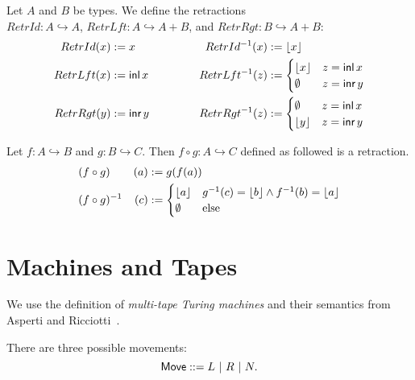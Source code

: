 \begin{definition}
  \label{def:retracts-basic}
  Let $A$ and $B$ be types.  We define the retractions\\
  $RetrId : A \hookrightarrow A$, $RetrLft : A \hookrightarrow A+B$, and $RetrRgt : B \hookrightarrow A+B$:
  \begin{alignat*}{2}
    RetrId(x)  &:= x      &\qquad\qquad RetrId ^{-1} (x) &:= \left\lfloor {x} \right\rfloor \\
    RetrLft(x) &:= \operatorname{\textsf{inl}} x &             RetrLft^{-1} (z) &:=
    \begin{cases}
      \left\lfloor {x} \right\rfloor & z = \operatorname{\textsf{inl}} x \\
      \emptyset   & z = \operatorname{\textsf{inr}} y
    \end{cases} \\
    RetrRgt(y) &:= \operatorname{\textsf{inr}} y & RetrRgt^{-1} (z) &:=
    \begin{cases}
      \emptyset   & z = \operatorname{\textsf{inl}} x \\
      \left\lfloor {y} \right\rfloor & z = \operatorname{\textsf{inr}} y
    \end{cases}
  \end{alignat*}
\end{definition}

\begin{definition}
  \label{def:retract-compose}
  Let $f : A \hookrightarrow B$ and $g : B \hookrightarrow C$.  Then $f \circ g : A \hookrightarrow C$ defined as followed is a retraction.
  \begin{alignat*}{2}
    & (f \circ g)      & (a) &:= g(f(a)) \\
    & (f \circ g)^{-1} & (c) &:=
    \begin{cases}
      \left\lfloor {a} \right\rfloor & g^{-1}(c) = \left\lfloor {b} \right\rfloor \land f^{-1}(b) = \left\lfloor {a} \right\rfloor \\
      \emptyset   & \text{else}
    \end{cases}
  \end{alignat*}
\end{definition}



\section{Machines and Tapes}
\label{sec:machine-tapes}

We use the definition of \emph{multi-tape Turing machines} and their semantics from Asperti and Ricciotti~\cite{asperti2015}.

\begin{definition}[Movement]
  \label{def:movement}
  There are three possible movements:
  $$\textsf{Move} ::= L ~|~ R ~|~ N.$$
\end{definition}


